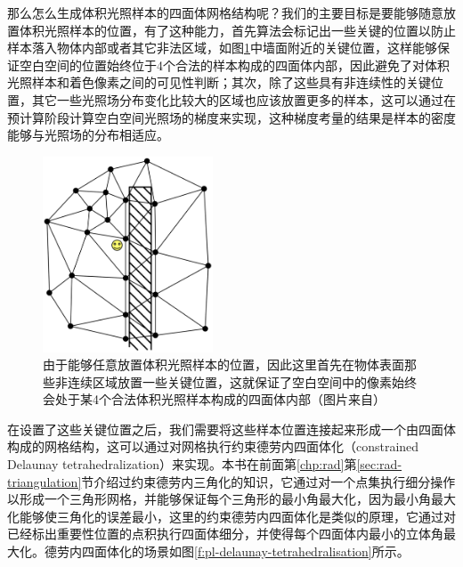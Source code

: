 那么怎么生成体积光照样本的四面体网格结构呢？我们的主要目标是要能够随意放置体积光照样本的位置，有了这种能力，首先算法会标记出一些关键的位置以防止样本落入物体内部或者其它非法区域，如图\ref{f:pl-key-points}中墙面附近的关键位置，这样能够保证空白空间的位置始终位于4个合法的样本构成的四面体内部，因此避免了对体积光照样本和着色像素之间的可见性判断；其次，除了这些具有非连续性的关键位置，其它一些光照场分布变化比较大的区域也应该放置更多的样本，这可以通过在预计算阶段计算空白空间光照场的梯度来实现，这种梯度考量的结果是样本的密度能够与光照场的分布相适应。

\begin{figure}
	\sidecaption
	\includegraphics[width=0.45\textwidth]{figures/pl/key-points}
	\caption{由于能够任意放置体积光照样本的位置，因此这里首先在物体表面那些非连续区域放置一些关键位置，这就保证了空白空间中的像素始终会处于某4个合法体积光照样本构成的四面体内部（图片来自\cite{a:Lightprobeinterpolationusingtetrahedraltessellations}）}
	\label{f:pl-key-points}
\end{figure}

在设置了这些关键位置之后，我们需要将这些样本位置连接起来形成一个由四面体构成的网格结构，这可以通过对网格执行约束德劳内四面体化（constrained Delaunay tetrahedralization）来实现。本书在前面第\ref{chp:rad}第\ref{sec:rad-triangulation}节介绍过约束德劳内三角化的知识，它通过对一个点集执行细分操作以形成一个三角形网格，并能够保证每个三角形的最小角最大化，因为最小角最大化能够使三角化的误差最小，这里的约束德劳内四面体化是类似的原理，它通过对已经标出重要性位置的点积执行四面体细分，并使得每个四面体内最小的立体角最大化。德劳内四面体化的场景如图\ref{f:pl-delaunay-tetrahedralisation}所示。

